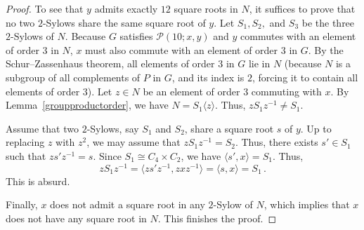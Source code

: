 \documentclass[12pt]{amsart}
\numberwithin{equation}{section}
\theoremstyle{definition}
\theoremstyle{remark}
\begin{document}
\begin{proof}
    To see that $y$ admits exactly $12$ square roots in $N$, it suffices to prove that no two $2$-Sylows share the same square root of $y$. Let $S_1, S_2,$ and $S_3$ be the three $2$-Sylows of $N$. Because $G$ satisfies $\mathcal{P}(10;x,y)$ and $y$ commutes with an element of order $3$ in $N$, $x$ must also commute with an element of order $3$ in $G$. By the Schur--Zassenhaus theorem, all elements of order $3$ in $G$ lie in $N$ (because $N$ is a subgroup of all complements of $P$ in $G$, and its index is $2$, forcing it to contain all elements of order $3$). Let $z \in N$ be an element of order $3$ commuting with $x$. By Lemma~\ref{groupproductorder}, we have $N = S_1\langle z\rangle$. Thus, $zS_1z^{-1} \ne S_1$. 

    Assume that two $2$-Sylows, say $S_1$ and $S_2$, share a square root $s$ of $y$. Up to replacing $z$ with $z^2$, we may assume that $zS_1z^{-1}=S_2$. Thus, there exists $s' \in S_1$ such that $z s' z^{-1} = s$. Since $S_1 \cong C_4 \times C_2$, we have $\langle s', x\rangle = S_1$. Thus, \[z S_1 z^{-1} = \langle z s' z^{-1}, z x z^{-1}\rangle = \langle s, x\rangle=S_1\, .\] This is absurd.
    
    Finally, $x$ does not admit a square root in any $2$-Sylow of $N$, which implies that $x$ does not have any square root in $N$. This finishes the proof.
\end{proof}
\end{document}
